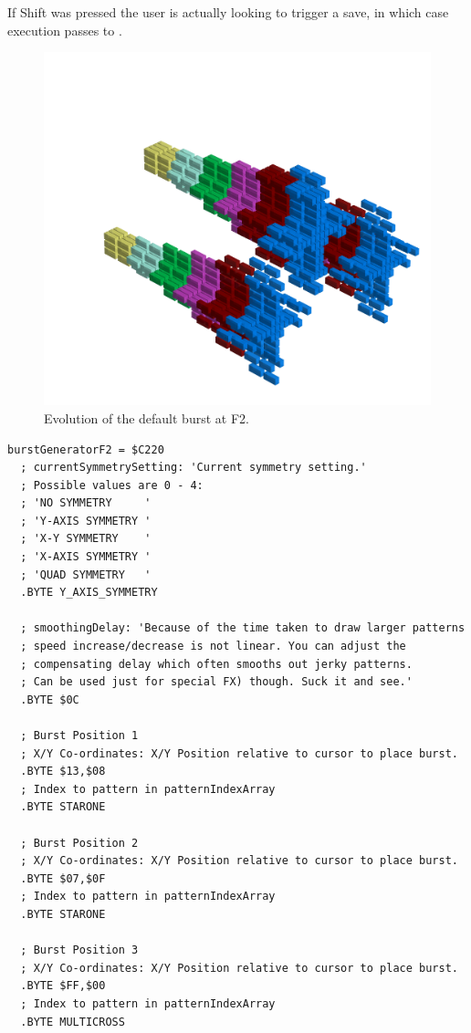 If Shift was pressed the user is actually looking to trigger a save, in which case execution passes to .

\clearpage
\begin{figure}[H]
    \centering
    \begin{adjustbox}{width=12cm,center}
      \includegraphics[width=12cm]{src/patterns/bursts/pattern1-45.png}%
    \end{adjustbox}
\caption{Evolution of the default burst at F2.}
\end{figure}
\clearpage

\begin{lstlisting}[caption=Source code for the F2 Burst.]
burstGeneratorF2 = $C220
  ; currentSymmetrySetting: 'Current symmetry setting.'
  ; Possible values are 0 - 4:
  ; 'NO SYMMETRY     '
  ; 'Y-AXIS SYMMETRY '
  ; 'X-Y SYMMETRY    '
  ; 'X-AXIS SYMMETRY '
  ; 'QUAD SYMMETRY   '
  .BYTE Y_AXIS_SYMMETRY

  ; smoothingDelay: 'Because of the time taken to draw larger patterns
  ; speed increase/decrease is not linear. You can adjust the 
  ; compensating delay which often smooths out jerky patterns.
  ; Can be used just for special FX) though. Suck it and see.'
  .BYTE $0C

  ; Burst Position 1
  ; X/Y Co-ordinates: X/Y Position relative to cursor to place burst.
  .BYTE $13,$08
  ; Index to pattern in patternIndexArray
  .BYTE STARONE

  ; Burst Position 2
  ; X/Y Co-ordinates: X/Y Position relative to cursor to place burst.
  .BYTE $07,$0F
  ; Index to pattern in patternIndexArray
  .BYTE STARONE

  ; Burst Position 3
  ; X/Y Co-ordinates: X/Y Position relative to cursor to place burst.
  .BYTE $FF,$00
  ; Index to pattern in patternIndexArray
  .BYTE MULTICROSS

\end{lstlisting}


